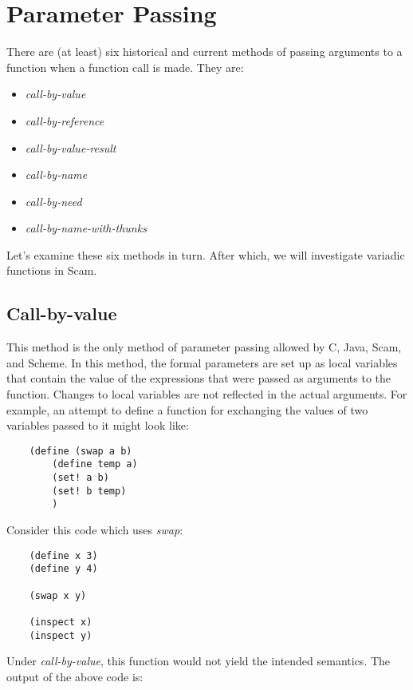 \chapter{Parameter Passing}
\label{ParameterPassing}

There are (at least) six historical and current
methods of passing arguments to a function when a function call
is made. They are:

\begin{itemize}
\item
    {\it call-by-value}
\item
    {\it call-by-reference}
\item
    {\it call-by-value-result}
\item
    {\it call-by-name}
\item
    {\it call-by-need}
\item
    {\it call-by-name-with-thunks}
\end{itemize}

Let's examine these six methods in turn. After which, we will
investigate variadic functions in Scam.

\section*{Call-by-value}

This method is the only method of parameter passing allowed by C, Java,
Scam, and Scheme. In this method, the formal parameters are set up as local
variables that contain the value of the expressions that were passed as
arguments to the function. Changes to local variables are not reflected
in the actual arguments. For example, an attempt to define a function
for exchanging the values
of two variables passed to it might look like:

\begin{verbatim}
    (define (swap a b)
        (define temp a)
        (set! a b)
        (set! b temp)
        )
\end{verbatim}

Consider this code which uses {\it swap}:

\begin{verbatim}
    (define x 3)
    (define y 4)

    (swap x y)

    (inspect x)
    (inspect y)
\end{verbatim}

Under {\it call-by-value},
this function would not yield the intended semantics.
The output of the above code is:

